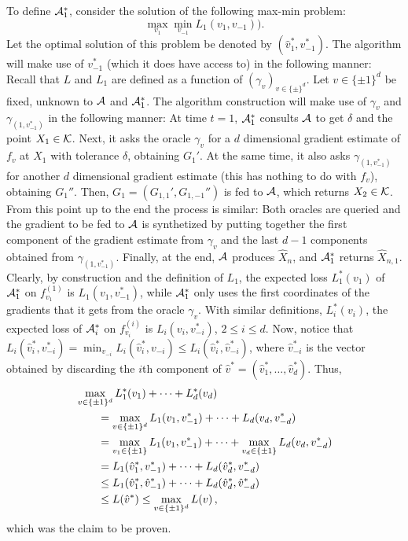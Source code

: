 To define $\mathcal{A}_1^*$, consider the solution of the following max-min problem:
\[
\max_{v_1} \min_{v_{-1}} L_1(v_1, v_{-1})).
\]
Let the optimal solution of this problem be denoted by $(\hat{v}_1^*,v_{-1}^*)$.
The algorithm will make use of $v_{-1}^*$ (which it does have access to) in the following manner:
Recall that $L$ and $L_1$ are defined as a function of $(\gamma_v)_{v\in \{\pm\}^d}$.
Let $v\in \{\pm 1\}^d$ be fixed, unknown to $\mathcal{A}$ and $\mathcal{A}_1^*$. 
The algorithm construction will make use of $\gamma_v$ and $\gamma_{(1,v_{-1}^*)}$ in the following manner:
At time $t=1$, $\mathcal{A}_1^*$ consults $\mathcal{A}$ to get $\delta$ and the point $X_1\in \mathcal{K}$.
Next, it asks the oracle $\gamma_v$ for a $d$ dimensional gradient estimate of $f_v$ at $X_1$ with tolerance $\delta$,
obtaining $G_1'$.
At the same time, it also asks $\gamma_{(1,v_{-1}^*)}$ for another $d$ dimensional gradient estimate (this has nothing to do with $f_v$), obtaining $G_1''$.
Then, $G_1 = (G_{1,1}',G_{1,-1}'')$ is fed to $\mathcal{A}$, which returns $X_2\in \mathcal{K}$. From this point up to the end the process is similar: Both oracles are queried and the gradient to be fed to $\mathcal{A}$ is synthetized by putting together the first component of the gradient estimate from $\gamma_v$ and the last $d-1$ components obtained from $\gamma_{(1,v_{-1}^*)}$.
Finally, at the end, $\mathcal{A}$ produces $\hat{X}_n$, and $\mathcal{A}_1^*$ returns $\hat{X}_{n,1}$.
Clearly, by construction and the definition of $L_1$,
the expected loss $L^*_1(v_1)$ of $\mathcal{A}_1^*$ on $f_{v_1}^{(1)}$ is $L_1(v_1,v_{-1}^*)$, while $\mathcal{A}_1^*$ only uses the first coordinates of the gradients that it gets from the oracle $\gamma_v$.
With similar definitions, $L^*_i(v_i)$, the expected loss of $\mathcal{A}_i^*$ on $f_{v_i}^{(i)}$ is $L_i(v_i,v_{-i}^*)$, $2\le i \le d$.
Now, notice that $L_i(\hat{v}_i^*,v_{-i}^*) = \min_{v_{-i} } L_i(\hat{v}_i^*,v_{-i}) \le L_i(\hat{v}_i^*, \hat{v}_{-i}^*)$,
where $\hat{v}_{-i}^*$ is the vector obtained by discarding the $i$th component of $\hat{v}^* = (\hat{v}_1^*,\dots,\hat{v}_d^*)$.
Thus,
\begin{align*}
\MoveEqLeft
\max_{v\in \{\pm 1 \}^d }
L^*_1(v_1) + \dots + L^*_d(v_d) \\
&   = \max_{v\in \{\pm 1 \}^d } L_1(v_1,v_{-1}^*) + \dots + L_d(v_d,v_{-d}^*)\\
& = \max_{v_1\in \{\pm 1\}} L_1(v_1,v_{-1}^*) + \dots +  \max_{v_d\in \{\pm 1\}} L_d(v_d,v_{-d}^*)\\
& = L_1(\hat{v}^*_1,v_{-1}^*) + \dots +   L_d(\hat{v}^*_d,v_{-d}^*)\\
& \le L_1(\hat{v}^*_1,\hat{v}_{-1}^*) + \dots +  L_d(\hat{v}^*_d,\hat{v}_{-d}^*)\\
& \le L(\hat{v}^*) \le \max_{v\in \{\pm 1\}^d } L(v)\,,
\end{align*}
which was the claim to be proven.

